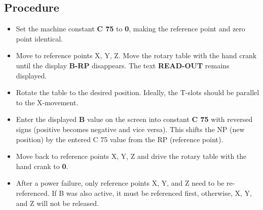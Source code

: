 \subsection*{Procedure}
\begin{itemize}
    \item Set the machine constant \textbf{C 75} to \textbf{0}, making the reference point and zero point identical.
    \item Move to reference points X, Y, Z. Move the rotary table with the hand crank until the display \textbf{B-RP} disappears. The text \textbf{READ-OUT} remains displayed.
    \item Rotate the table to the desired position. Ideally, the T-slots should be parallel to the X-movement.
    \item Enter the displayed \textbf{B} value on the screen into constant \textbf{C 75} with reversed signs (positive becomes negative and vice versa). This shifts the NP (new position) by the entered C 75 value from the RP (reference point).
    \item Move back to reference points X, Y, Z and drive the rotary table with the hand crank to \textbf{0}.
    \item After a power failure, only reference points X, Y, and Z need to be re-referenced. If B was also active, it must be referenced first, otherwise, X, Y, and Z will not be released.
\end{itemize}

